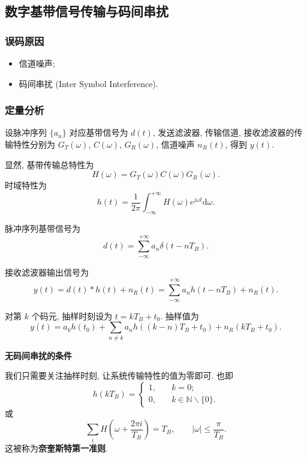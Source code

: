 \subsection{数字基带信号传输与码间串扰}
\subsubsection{误码原因}
\begin{itemize}
    \item 信道噪声;
    \item 码间串扰 (Inter Symbol Interference).
\end{itemize}

\subsubsection{定量分析}
设脉冲序列 $\{a_n\}$ 对应基带信号为 $d(t)$, 发送滤波器, 传输信道, 接收滤波器的传输特性分别为 $G_T(\omega)$, $C(\omega)$, $G_R(\omega)$, 信道噪声 $n_R(t)$, 得到 $y(t)$.

显然, 基带传输总特性为
\begin{equation}
    H(\omega)=G_T(\omega)C(\omega)G_R(\omega).
\end{equation}
时域特性为
\begin{equation}
    h(t)=\frac{1}{2\pi}\int_{-\infty}^{+\infty}H(\omega)e^{j\omega t}\mathrm{d}\omega.
\end{equation}

脉冲序列基带信号为
\begin{equation}
    d(t)=\sum_{-\infty}^{+\infty}a_n\delta(t-nT_B).
\end{equation}

接收滤波器输出信号为
\begin{equation}
    y(t)=d(t)*h(t)+n_R(t)=\sum_{-\infty}^{+\infty}a_nh(t-nT_B)+n_R(t).
\end{equation}

对第 $k$ 个码元, 抽样时刻设为 $t=kT_B+t_0$. 抽样值为
\begin{equation}
    y(t)=a_kh(t_0)+\sum_{n\neq k}a_nh((k-n)T_B+t_0)+n_R(kT_B+t_0).
\end{equation}

\textbf{无码间串扰的条件}

我们只需要关注抽样时刻, 让系统传输特性的值为零即可. 也即
\begin{equation}
    h(kT_B)=\begin{cases}
        1, & \quad k=0;                           \\
        0, & \quad k\in\mathbb{N}\backslash\{0\}.
    \end{cases}
\end{equation}
或
\begin{equation}
    \sum_{i}H\left(\omega+\frac{2\pi i}{T_B}\right)=T_B, \qquad |\omega|\leq\frac{\pi}{T_B}.
\end{equation}
这被称为\textbf{奈奎斯特第一准则}.

